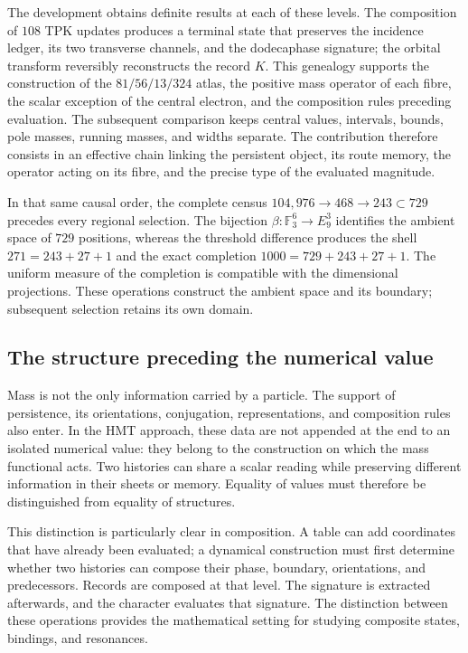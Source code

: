 The development obtains definite results at each of these levels. The
composition of \(108\) TPK updates produces a terminal state
that preserves the incidence ledger, its two transverse channels, and the
dodecaphase signature; the orbital transform reversibly reconstructs the record
\(K\). This genealogy supports the construction of the
\(81/56/13/324\) atlas, the positive mass operator of each fibre, the
scalar exception of the central electron, and the composition rules preceding
evaluation. The subsequent comparison keeps central values,
intervals, bounds, pole masses, running masses, and widths separate. The contribution
therefore consists in an effective chain linking the persistent object,
its route memory, the operator acting on its fibre, and the precise type of
the evaluated magnitude.

In that same causal order, the complete census
\(104{,}976\to468\to243\subset729\) precedes every regional selection. The
bijection \(\beta:\mathbb F_3^6\to E_9^3\) identifies the ambient space of
\(729\) positions, whereas the threshold difference produces the shell
\(271=243+27+1\) and the exact completion
\(1000=729+243+27+1\). The uniform measure of the completion is compatible
with the dimensional projections. These operations construct the ambient
space and its boundary; subsequent selection retains its own domain.

\subsection{The structure preceding the numerical value}

Mass is not the only information carried by a particle. The
support of persistence, its orientations, conjugation,
representations, and composition rules also enter. In the HMT approach,
these data are not appended at the end to an isolated numerical value: they belong to the
construction on which the mass functional acts. Two histories can
share a scalar reading while preserving different information in their
sheets or memory. Equality of values must therefore be distinguished
from equality of structures.

This distinction is particularly clear in composition. A table can
add coordinates that have already been evaluated; a dynamical construction must first determine whether two
histories can compose their phase, boundary, orientations, and
predecessors. Records are composed at that level. The signature is extracted
afterwards, and the character evaluates that signature. The distinction between these
operations provides the mathematical setting for studying composite states,
bindings, and resonances.

